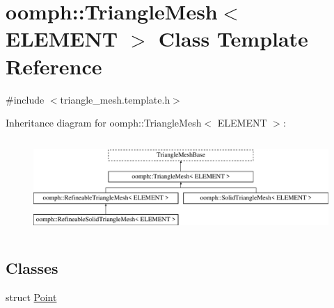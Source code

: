 \hypertarget{classoomph_1_1TriangleMesh}{}\section{oomph\+:\+:Triangle\+Mesh$<$ E\+L\+E\+M\+E\+NT $>$ Class Template Reference}
\label{classoomph_1_1TriangleMesh}


{\ttfamily \#include $<$triangle\+\_\+mesh.\+template.\+h$>$}

Inheritance diagram for oomph\+:\+:Triangle\+Mesh$<$ E\+L\+E\+M\+E\+NT $>$\+:\begin{figure}[H]
\begin{center}
\leavevmode
\includegraphics[height=3.612903cm]{classoomph_1_1TriangleMesh}
\end{center}
\end{figure}
\subsection*{Classes}
\begin{DoxyCompactItemize}
\item 
struct \hyperlink{structoomph_1_1TriangleMesh_1_1Point}{Point}
\end{DoxyCompactItemize}
